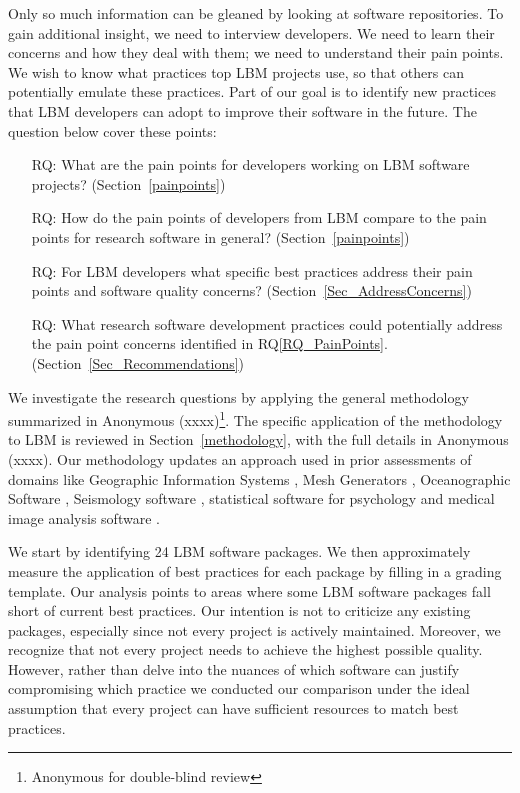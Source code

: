 \documentclass[final, 3p, times, authoryear]{elsarticle}
\newcounter{rqnum} %
\newcommand{\rqref}[1]{RQ\ref{#1}}
\begin{document}
Only so much information can be gleaned by looking at software repositories.  To
gain additional insight, we need to interview developers.  We need to learn
their concerns and how they deal with them; we need to understand their pain
points. We wish to know what practices top LBM projects use, so that
others can potentially emulate these practices. Part of our goal is to identify new
practices that LBM developers can adopt to improve their software in the future.
The question below cover these points: 

\begin{enumerate}
	\item [RQ\refstepcounter{rqnum}\therqnum \label{RQ_PainPoints}:] What are
	the pain points for developers working on LBM software projects?
	(Section~\ref{painpoints})
	\item [RQ\refstepcounter{rqnum}\therqnum \label{RQ_ComparePainPoints}:] How
	do the pain points of developers from LBM compare to the pain points
	for research software in general? (Section~\ref{painpoints})
	\item [RQ\refstepcounter{rqnum}\therqnum \label{RQ_Concerns}:] For LBM
	developers what specific best practices address their pain points
	and software quality concerns? (Section~\ref{Sec_AddressConcerns})
	\item [RQ\refstepcounter{rqnum}\therqnum \label{RQ_Recommend}:]
	What research software development practices could potentially address the
	pain point concerns identified in \rqref{RQ_PainPoints}.
	(Section~\ref{Sec_Recommendations})
\end{enumerate}

We investigate the research questions by applying the general methodology
summarized in Anonymous (xxxx)\footnote{Anonymous for double-blind
review}.  %
The specific
application of the methodology to LBM is reviewed in Section~\ref{methodology},
with the full details in Anonymous (xxxx)\footnotemark[1].  %
Our methodology updates
an approach used in prior assessments of domains like Geographic Information
Systems \citep{SmithEtAl2018_arXivGIS}, Mesh Generators \citep{SmithEtAl2016},
Oceanographic Software \citep{smith2015state}, Seismology software
\citep{SmithEtAl2018}, statistical software for psychology
\citep{SmithEtAl2018_StatSoft} and medical image analysis software
\citep{Dong2021}.

We start by identifying 24 LBM software packages.  We then approximately measure
the application of best practices for each package by filling in a grading
template. Our analysis points to areas where some LBM software packages fall
short of current best practices.  Our intention is not to criticize any existing
packages, especially since not every project is actively maintained.  Moreover,
we recognize that not every project needs to achieve the highest possible
quality.  However, rather than delve into the nuances of which software can
justify compromising which practice we conducted our comparison under the ideal
assumption that every project can have sufficient resources to match best
practices.
\end{document}
